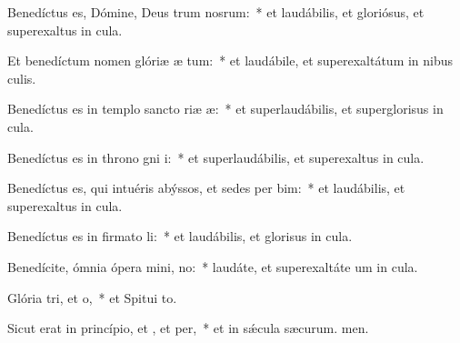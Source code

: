 \item Benedíctus es, Dómine, Deus trum nosrum:~* et laudábilis, et gloriósus, et superexaltus in cula.

\item Et benedíctum nomen glóriæ æ tum:~* et laudábile, et superexaltátum in nibus culis.

\item Benedíctus es in templo sancto riæ æ:~* et superlaudábilis, et superglorisus in cula.

\item Benedíctus es in throno gni i:~* et superlaudábilis, et superexaltus in cula.

\item Benedíctus es, qui intuéris abýssos, et sedes per bim:~* et laudábilis, et superexaltus in cula.

\item Benedíctus es in firmato li:~* et laudábilis, et glorisus in cula.

\item Benedícite, ómnia ópera mini, no:~* laudáte, et superexaltáte um in cula.

\item Glória tri, et o,~* et Spitui to.

\item Sicut erat in princípio, et , et per,~* et in sǽcula sæcurum. men.


